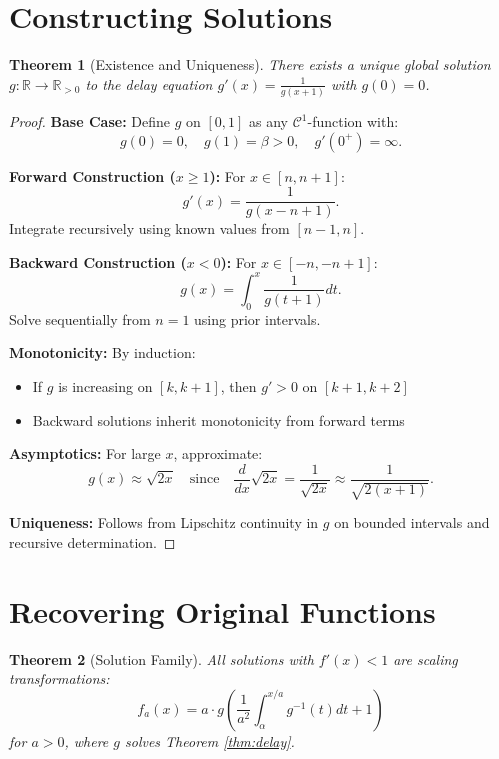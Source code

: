 \documentclass[11pt, a4paper, oneside]{article}
\newtheorem{theorem}{Theorem}
\theoremstyle{remark}
\theoremstyle{lemma}
\begin{document}
\section{Constructing Solutions}

\begin{theorem}[Existence and Uniqueness]\label{thm:existence}
There exists a unique global solution \( g: \mathbb{R} \to \mathbb{R}_{>0} \) to the delay equation \( g'(x) = \frac{1}{g(x + 1)} \) with \( g(0) = 0 \).
\end{theorem}

\begin{proof}
\textbf{Base Case:} Define \( g \) on \( [0, 1] \) as any \( \mathcal{C}^1 \)-function with:
\[
g(0) = 0, \quad g(1) = \beta > 0, \quad g'(0^+) = \infty.
\]

\textbf{Forward Construction ($x \geq 1$):} For \( x \in [n, n+1] \):
\[
g'(x) = \frac{1}{g(x - n + 1)}.
\]
Integrate recursively using known values from \( [n-1, n] \).

\textbf{Backward Construction ($x < 0$):} For \( x \in [-n, -n+1] \):
\[
g(x) = \int_0^x \frac{1}{g(t + 1)} dt.
\]
Solve sequentially from \( n=1 \) using prior intervals.

\textbf{Monotonicity:} By induction:
\begin{itemize}
\item If \( g \) is increasing on \( [k, k+1] \), then \( g' > 0 \) on \( [k+1, k+2] \)
\item Backward solutions inherit monotonicity from forward terms
\end{itemize}

\textbf{Asymptotics:} For large \( x \), approximate:
\[
g(x) \approx \sqrt{2x} \quad \text{since} \quad \frac{d}{dx}\sqrt{2x} = \frac{1}{\sqrt{2x}} \approx \frac{1}{\sqrt{2(x+1)}}.
\]

\textbf{Uniqueness:} Follows from Lipschitz continuity in \( g \) on bounded intervals and recursive determination.
\end{proof}

\section{Recovering Original Functions}

\begin{theorem}[Solution Family]\label{thm:family}
All solutions with \( f'(x) < 1 \) are scaling transformations:
\[
f_a(x) = a \cdot g\left(\frac{1}{a^2} \int_{\alpha}^{x/a} g^{-1}(t) dt + 1\right)
\]
for \( a > 0 \), where \( g \) solves Theorem \ref{thm:delay}.
\end{theorem}
\end{document}
